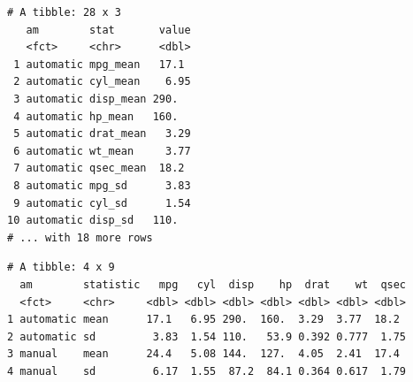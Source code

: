 \documentclass[
  11pt,
]{krantz}
\newenvironment{Shaded}{\begin{snugshade}}{\end{snugshade}}
\newcommand{\CommentTok}[1]{\textcolor[rgb]{0.37,0.37,0.37}{\textit{#1}}}
\newcommand{\DataTypeTok}[1]{\textcolor[rgb]{0.27,0.27,0.27}{#1}}
\newcommand{\KeywordTok}[1]{\textcolor[rgb]{0.27,0.27,0.27}{\textbf{#1}}}
\newcommand{\NormalTok}[1]{#1}
\newcommand{\OperatorTok}[1]{\textcolor[rgb]{0.43,0.43,0.43}{\textbf{#1}}}
\newcommand{\StringTok}[1]{\textcolor[rgb]{0.5,0.5,0.5}{#1}}
\begin{document}
\begin{Shaded}
\end{Shaded}

\begin{verbatim}
# A tibble: 28 x 3
   am        stat       value
   <fct>     <chr>      <dbl>
 1 automatic mpg_mean   17.1 
 2 automatic cyl_mean    6.95
 3 automatic disp_mean 290.  
 4 automatic hp_mean   160.  
 5 automatic drat_mean   3.29
 6 automatic wt_mean     3.77
 7 automatic qsec_mean  18.2 
 8 automatic mpg_sd      3.83
 9 automatic cyl_sd      1.54
10 automatic disp_sd   110.  
# ... with 18 more rows
\end{verbatim}

\begin{Shaded}
\end{Shaded}

\begin{verbatim}
# A tibble: 4 x 9
  am        statistic   mpg   cyl  disp    hp  drat    wt  qsec
  <fct>     <chr>     <dbl> <dbl> <dbl> <dbl> <dbl> <dbl> <dbl>
1 automatic mean      17.1   6.95 290.  160.  3.29  3.77  18.2 
2 automatic sd         3.83  1.54 110.   53.9 0.392 0.777  1.75
3 manual    mean      24.4   5.08 144.  127.  4.05  2.41  17.4 
4 manual    sd         6.17  1.55  87.2  84.1 0.364 0.617  1.79
\end{verbatim}
\end{document}
